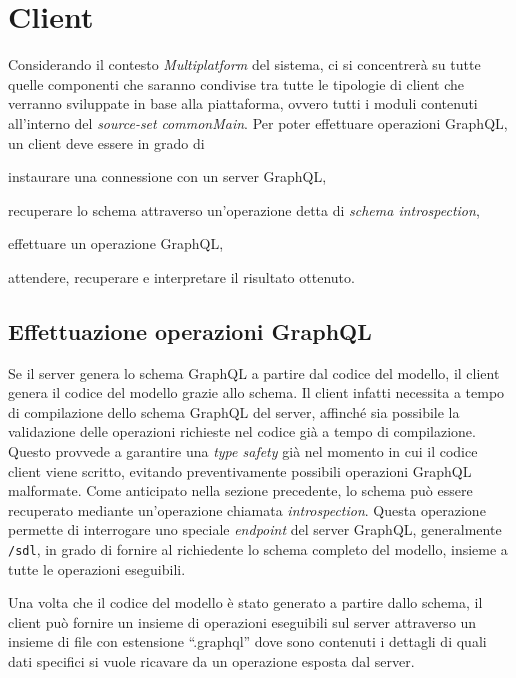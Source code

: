 
\section{Client}\label{sec:client}
Considerando il contesto \textit{Multiplatform} del sistema, ci si concentrerà su tutte quelle componenti che saranno condivise tra tutte le tipologie
di client che verranno sviluppate in base alla piattaforma, ovvero tutti i moduli contenuti all'interno del \textit{source-set} \textit{commonMain}.
Per poter effettuare operazioni GraphQL, un client deve essere in grado di 
\begin{enumerate*}[label=(\roman*)]
    \item instaurare una connessione con un server GraphQL,
    \item recuperare lo schema attraverso un'operazione detta di \textit{schema introspection},
    \item effettuare un operazione GraphQL,
    \item attendere, recuperare e interpretare il risultato ottenuto.
\end{enumerate*}

\subsection{Effettuazione operazioni GraphQL}\label{ssec:client-gql-apis}
Se il server genera lo schema GraphQL a partire dal codice del modello, il client genera il codice del modello grazie allo schema. Il client infatti
necessita a tempo di compilazione dello schema GraphQL del server, affinché sia possibile la validazione delle operazioni richieste nel codice
già a tempo di compilazione. Questo provvede a garantire una \textit{type safety} già nel momento in cui il codice client viene scritto, evitando
preventivamente possibili operazioni GraphQL malformate. Come anticipato nella sezione precedente, lo schema può essere recuperato mediante un'operazione
chiamata \textit{introspection}. Questa operazione permette di interrogare uno speciale \textit{endpoint} del server GraphQL, generalmente \texttt{/sdl},
in grado di fornire al richiedente lo schema completo del modello, insieme a tutte le operazioni eseguibili.

Una volta che il codice del modello è stato generato a partire dallo schema, il client può fornire un insieme di operazioni eseguibili sul server attraverso
un insieme di file con estensione ``.graphql'' dove sono contenuti i dettagli di quali dati specifici si vuole ricavare da un operazione esposta dal server.

